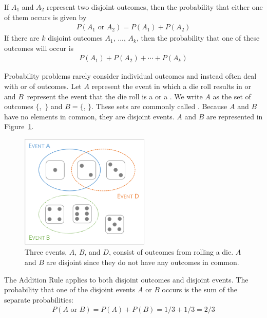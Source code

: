 \begin{termBox}{ If $A_1$ and $A_2$ represent two disjoint outcomes, then the probability that either one of them occurs is given by
\begin{eqnarray*}
P(A_1\text{ or } A_2) = P(A_1) + P(A_2)
\end{eqnarray*}
If there are $k$ disjoint outcomes $A_1$, ..., $A_k$, then the probability that one of these outcomes will occur is
\begin{eqnarray}
P(A_1) + P(A_2) + \cdots + P(A_k)
\end{eqnarray}
}
\end{termBox}



Probability problems rarely consider individual outcomes and instead often deal with  or  of outcomes. Let $A$ represent the event in which a die roll results in  or  and $B$~represent the event that the die roll is a  or a . We write $A$ as the set of outcomes $\{$,~$\}$ and $B=\{$, $\}$. These sets are commonly called . Because $A$ and $B$ have no elements in common, they are disjoint events. $A$ and $B$ are represented in Figure~\ref{fig:disjointEvents}.

\begin{figure}[hhh]
\centering
\includegraphics[width=0.55\textwidth]{ch_probability_oi_biostat/figures/disjointEvents/disjointEvents.png}
\caption{Three events, $A$, $B$, and $D$, consist of outcomes from rolling a die. $A$ and $B$ are disjoint since they do not have any outcomes in common.}
\label{fig:disjointEvents}
\end{figure}

The Addition Rule applies to both disjoint outcomes and disjoint events. The probability that one of the disjoint events $A$ or $B$ occurs is the sum of the separate probabilities:
\begin{align*}
P(A\text{ or }B) = P(A) + P(B) = 1/3 + 1/3 = 2/3
\end{align*}

